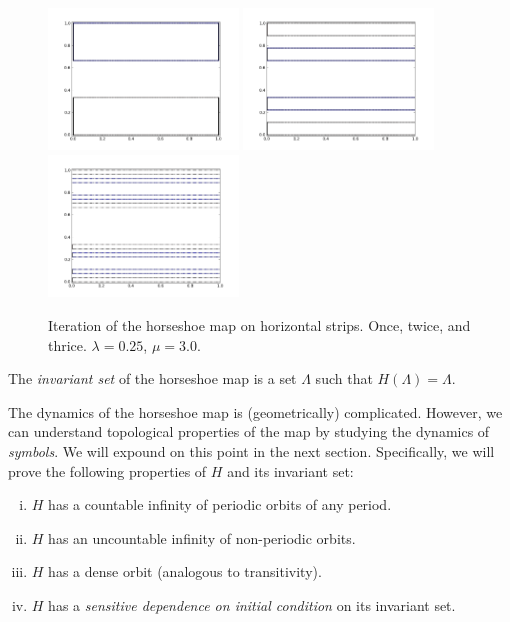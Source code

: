 \documentclass[12pt,twoside]{book}
\begin{document}
\begin{figure}[ht]
  \centering
    \includegraphics[width=0.45\textwidth]{horseshoe_h1}
    \hspace{2mm}
    \includegraphics[width=0.45\textwidth]{horseshoe_h2}
    \hspace{2mm}
    \includegraphics[width=0.45\textwidth]{horseshoe_h3}
  \caption{
    Iteration of the horseshoe map on horizontal strips. Once, twice, and thrice.
    $\lambda = 0.25$, $\mu = 3.0$.
  }
  \label{fig:horseshoe-horizontal}
\end{figure}

The \textit{invariant set} of the horseshoe map is a set $\Lambda$ such that $H(\Lambda) = \Lambda$.

The dynamics of the horseshoe map is (geometrically) complicated.
However, we can understand topological properties of the map by studying the dynamics of \textit{symbols}.
We will expound on this point in the next section.
Specifically, we will prove the following properties of $H$ and its invariant set:
\begin{enumerate}[(i)]
  \item $H$ has a countable infinity of periodic orbits of any period.
  \item $H$ has an uncountable infinity of non-periodic orbits.
  \item $H$ has a dense orbit (analogous to transitivity).
  \item $H$ has a \textit{sensitive dependence on initial condition} on its invariant set.
\end{enumerate}
\end{document}
